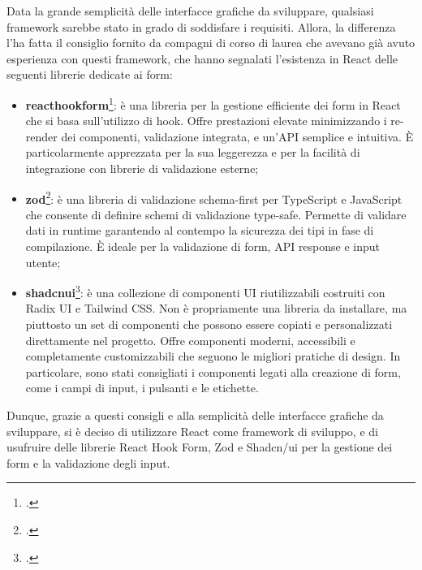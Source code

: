 Data la grande semplicità delle interfacce grafiche da sviluppare, qualsiasi framework sarebbe stato in grado di soddisfare i requisiti. Allora, la differenza l'ha fatta il consiglio fornito da compagni di corso di laurea che avevano già avuto esperienza con questi framework, che hanno segnalati l'esistenza in React delle seguenti librerie dedicate ai form:
\begin{itemize}
    \item \textbf{\gls{reacthookform}}\footcite{site:react-hook-form}: è una libreria per la gestione efficiente dei form in React che si basa sull'utilizzo di \gls{hook}. Offre prestazioni elevate minimizzando i re-render dei componenti, validazione integrata, e un'API semplice e intuitiva. È particolarmente apprezzata per la sua leggerezza e per la facilità di integrazione con librerie di validazione esterne;
    \item \textbf{\gls{zod}}\footcite{site:zod}: è una libreria di validazione schema-first per TypeScript e JavaScript che consente di definire schemi di validazione type-safe. Permette di validare dati in runtime garantendo al contempo la sicurezza dei tipi in fase di compilazione. È ideale per la validazione di form, API response e input utente;
    \item \textbf{\gls{shadcnui}}\footcite{site:shadcn-ui}: è una collezione di componenti UI riutilizzabili costruiti con Radix UI e Tailwind CSS. Non è propriamente una libreria da installare, ma piuttosto un set di componenti che possono essere copiati e personalizzati direttamente nel progetto. Offre componenti moderni, accessibili e completamente customizzabili che seguono le migliori pratiche di design. In particolare, sono stati consigliati i componenti legati alla creazione di form, come i campi di input, i pulsanti e le etichette.
\end{itemize}

Dunque, grazie a questi consigli e alla semplicità delle interfacce grafiche da sviluppare, si è deciso di utilizzare React come framework di sviluppo, e di usufruire delle librerie React Hook Form, Zod e Shadcn/ui per la gestione dei form e la validazione degli input.

